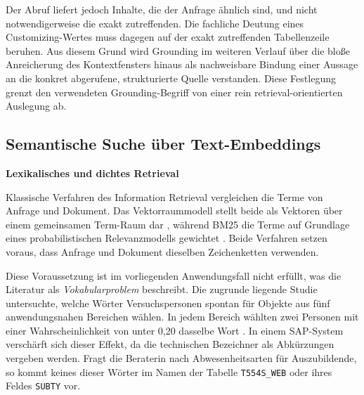 Der Abruf liefert jedoch Inhalte, die der Anfrage ähnlich sind, und nicht notwendigerweise die exakt zutreffenden. Die fachliche Deutung eines Customizing-Wertes muss dagegen auf der exakt zutreffenden Tabellenzeile beruhen. Aus diesem Grund wird Grounding im weiteren Verlauf über die bloße Anreicherung des Kontextfensters hinaus als nachweisbare Bindung einer Aussage an die konkret abgerufene, strukturierte Quelle verstanden. Diese Festlegung grenzt den verwendeten Grounding-Begriff von einer rein retrieval-orientierten Auslegung ab.

\subsection{Semantische Suche über Text-Embeddings}
\label{subsec:embeddings}

\textbf{Lexikalisches und dichtes Retrieval}

Klassische Verfahren des Information Retrieval vergleichen die Terme von Anfrage und Dokument. Das Vektorraummodell stellt beide als Vektoren über einem gemeinsamen Term-Raum dar \cite{salton_vector_1975}, während BM25 die Terme auf Grundlage eines probabilistischen Relevanzmodells gewichtet \cite{robertson_probabilistic_2009}. Beide Verfahren setzen voraus, dass Anfrage und Dokument dieselben Zeichenketten verwenden.

Diese Voraussetzung ist im vorliegenden Anwendungsfall nicht erfüllt, was die Literatur als \emph{Vokabularproblem} beschreibt. Die zugrunde liegende Studie untersuchte, welche Wörter Versuchspersonen spontan für Objekte aus fünf anwendungsnahen Bereichen wählen. In jedem Bereich wählten zwei Personen mit einer Wahrscheinlichkeit von unter 0,20 dasselbe Wort \cite{furnas_vocabulary_1987}. %
In einem SAP-System verschärft sich dieser Effekt, da die technischen Bezeichner als Abkürzungen vergeben werden. Fragt die Beraterin nach \glqq Abwesenheitsarten für Auszubildende\grqq{}, so kommt keines dieser Wörter im Namen der Tabelle \texttt{T554S\_WEB} oder ihres Feldes \texttt{SUBTY} vor.

